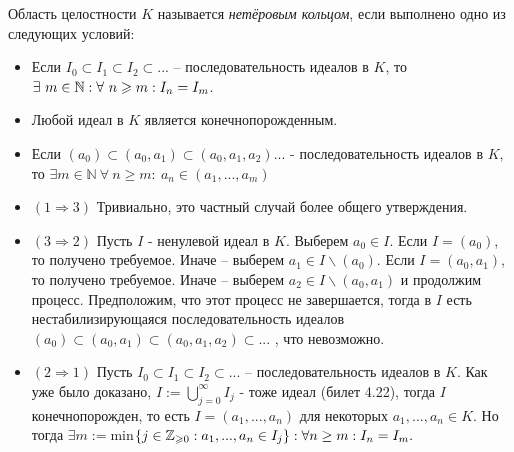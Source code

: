  \Def Область целостности $K$ называется \textit{нетёровым кольцом}, если выполнено одно из следующих условий:
\begin{itemize}
    \item [1] Если $I_0 \subset I_1 \subset I_2 \subset . . . $ -- последовательность идеалов в $K$, то $\exists \ m \in \mathbb{N} : \forall \ n \geqslant m :I_n = I_m$.
    \item [2] Любой идеал в $K$ является конечнопорожденным.
    \item[3] Если $(a_0) \subset (a_0, a_1) \subset (a_0, a_1, a_2) ... $ - последовательность идеалов в $K$, то $\exists m \in \mathbb{N} \ \forall \ n \geq m: \ a_n \in (a_1, ..., a_m)$
\end{itemize}
\Proof
 \begin{itemize}
     \item []$(1 \Longrightarrow 3)$  Тривиально, это частный случай более общего утверждения.
       \item []$(3 \Longrightarrow 2)$ Пусть $I$ - ненулевой идеал в $K$. Выберем $a_0 \in I$. \newline Если $I = (a_0)$, то получено требуемое. \newline Иначе -- выберем $a_1 \in I\backslash (a_0)$. Если $I = (a_0, a_1)$, то получено требуемое. Иначе -- выберем $a_2 \in I\backslash (a_0, a_1)$ и продолжим процесс. Предположим, что этот процесс не завершается, тогда в $I$ есть нестабилизирующаяся последовательность идеалов $(a_0) \subset (a_0, a_1) \subset (a_0, a_1, a_2) \subset ...$ , что невозможно.
       \item []$(2 \Longrightarrow 1)$ Пусть $I_0 \subset I_1 \subset I_2 \subset . . .$ -- последовательность идеалов в $K$. Как уже было
доказано, $I :=  \bigcup\limits_{j=0}^{\infty} I_j$ - тоже идеал (билет 4.22), тогда $I$ конечнопорожден, то есть $I = (a_1, . . . , a_n)$
для некоторых $a_1, . . . , a_n \in K$. Но тогда $\exists m := $min$\{j \in \mathbb{Z}_{\geqslant 0} : a_1, . . . , a_n \in I_j\} :
\forall n \geq m : I_n = I_m.$
 \end{itemize}
 \EndProof
